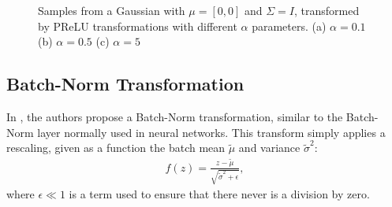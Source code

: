 \begin{figure}[!htb]
  \begin{subfigmatrix}{3}
  \end{subfigmatrix}
    \caption{Samples from a Gaussian with $\mu = [0, 0]$ and $\Sigma = I$, transformed
    by PReLU transformations with different $\alpha$ parameters. (a) $\alpha = 0.1$
    (b) $\alpha = 0.5$ (c) $\alpha = 5$}
  \label{fig:prelu}
\end{figure}

\subsection{Batch-Norm Transformation}
In \cite{real-nvp}, the authors propose a Batch-Norm transformation, similar to
the Batch-Norm layer normally used in neural networks. This transform simply
applies a rescaling, given as a function the batch mean $\tilde\mu$ and variance
${\tilde\sigma}^2$:
\begin{align}
    f(z) = \frac{z - \tilde\mu}{\sqrt{{\tilde\sigma}^2 + \epsilon}},
\end{align} where $\epsilon \ll 1$ is a term used to ensure that there never is
a division by zero.

